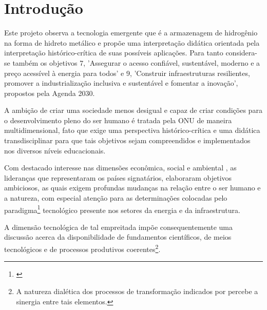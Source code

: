 \documentclass[
   article,       %
   12pt,          %
   oneside,       %
   a4paper,       %
   english,       %
   brazil,           %
   sumario=tradicional
   ]{abntex2}
\begin{document}

\frenchspacing 


\maketitle


\newpage

\textual
\section{Introdução}

Este projeto observa a tecnologia emergente que é a armazenagem de hidrogênio na forma de hidreto metálico \cite[p. 29-31]{Materials_for_hydrogen_storage} e propõe uma interpretação didática orientada pela interpretação histórico-crítica de suas possíveis aplicações. Para tanto considera-se também os objetivos 7, 'Assegurar o acesso confiável, sustentável, moderno e a preço
acessível à energia para todos' \cite[p. 21]{Agenda_2030} e 9, 'Construir infraestruturas resilientes, promover a industrialização inclusiva e sustentável e fomentar a inovação', \cite[p. 22]{Agenda_2030} propostos pela Agenda 2030.

A ambição de criar uma sociedade menos desigual e capaz de criar condições para o desenvolvimento pleno do ser humano é tratada pela ONU de maneira multidimensional, fato que exige uma perspectiva histórico-crítica e uma didática transdisciplinar \cite[Cap.~7-9]{Lincoln1985-ua} para que tais objetivos sejam compreendidos e implementados nos diversos níveis educacionais.

Com destacado interesse nas dimensões econômica, social e ambiental \cite[p. 6]{Agenda_2030}, as lideranças que representaram os países signatários, elaboraram objetivos ambiciosos, as quais exigem profundas mudanças na relação entre o ser humano e a natureza, com especial atenção para as determinações colocadas pelo paradigma\footnote{\cite[Cap.~3]{Kuhn2012-oa}} tecnológico presente nos setores da energia e da infraestrutura.

A dimensão tecnológica de tal empreitada impõe consequentemente uma discussão acerca da disponibilidade de fundamentos científicos, de meios tecnológicos e de processos produtivos coerentes\footnote{A natureza dialética dos processos de transformação indicados por \cite{DIALECTICAL_TECHNOLOGY} percebe a sinergia entre tais elementos.}.
\end{document}
